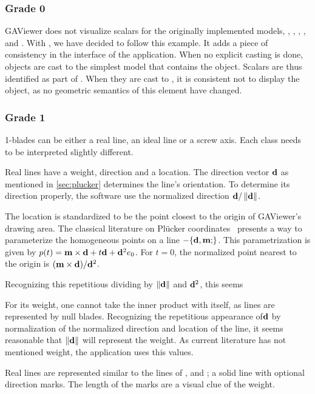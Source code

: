 \subsubsection{Grade 0}
GAViewer does not visualize scalars for the originally implemented models, \ega{}, \pga{}, \cga{}, \cbga{}, and \iga.  With \lga{}, we have decided to follow this example.  It adds a piece of consistency in the interface of the application.  When no explicit casting is done, objects are cast to the simplest model that contains the object.  Scalars are thus identified as part of \ega{}.  When they are cast to \lga{}, it is consistent not to display the object, as no geometric semantics of this element have changed.


\subsubsection{Grade 1}
1-blades can be either a real line, an ideal line or a screw axis.  Each class needs to be interpreted slightly different.

Real lines have a weight, direction and a location.  The direction vector $\mathbf{d}$ as mentioned in \autoref{sec:plucker} determines the line's orientation.  To determine its direction properly, the software use the normalized direction $\mathbf{d} / \left\|\mathbf{d}\right\|$.

The location is standardized to be the point closest to the origin of GAViewer's drawing area.  The classical literature on Pl\"ucker coordinates~\cite{Shoemake} presents a way to parameterize the homogeneous points on a line $-\plucker{\V{d}, \V{m}}$.  This parametrization is given by $p(t) = \mathbf{m} \times \mathbf{d} + t \mathbf{d} + \mathbf{d}^2e_0$.  For $t = 0$, the normalized point nearest to the origin is $(\mathbf{m} \times \mathbf{d}) / \mathbf{d}^2$.

Recognizing this repetitious dividing by $\left\|\mathbf{d}\right\|$ and $\mathbf{d}^2$, this seems

For its weight, one cannot take the inner product with itself, as lines are represented by null blades.  Recognizing the repetitious appearance of$\mathbf{d}$ by normalization of the normalized direction and location of the line, it seems reasonable that $\left\|\mathbf{d}\right\|$ will represent the weight.  As current literature has not mentioned weight, the application uses this values.

Real lines are represented similar to the lines of \pga, \cga and \cbga; a solid line with optional direction marks.  The length of the marks are a visual clue of the weight.

